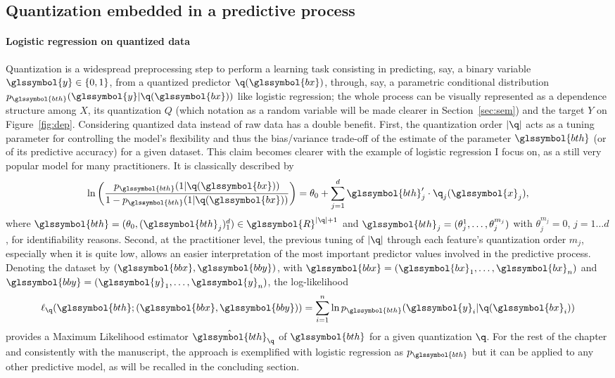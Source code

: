 \subsection{Quantization embedded in a predictive process}

\paragraph{Logistic regression on quantized data}

Quantization is a widespread preprocessing step to perform a learning task consisting in predicting, say, a binary variable $\glssymbol{y}\in\{0,1\}$, from a quantized predictor  $\q(\glssymbol{bx})$, through, say, a parametric conditional distribution $p_{\glssymbol{bth}}(\glssymbol{y}|\q(\glssymbol{bx}))$ like logistic regression; the whole process can be visually represented as a dependence structure among $X$, its quantization $Q$ (which notation as a random variable will be made clearer in Section~\ref{sec:sem}) and the target $Y$ on Figure~\ref{fig:dep}. Considering quantized data instead of raw data has a double benefit. First, the quantization order $|\q|$ acts as a tuning parameter for controlling the model's flexibility and thus the bias/variance trade-off of the estimate of the parameter $\glssymbol{bth}$ (or of its predictive accuracy) for a given dataset. This claim becomes clearer with the example of logistic regression I focus on, as a still very popular model for many practitioners. It is classically described by
\begin{equation}
    \label{eq:reglogq}
\ln \left( \dfrac{p_{\glssymbol{bth}}(1|\q(\glssymbol{bx}))}{1 - p_{\glssymbol{bth}}(1|\q(\glssymbol{bx}))} \right) = \theta_0 + \sum_{j=1}^d \glssymbol{bth}_j' \cdot \q_j(\glssymbol{x}_j),
\end{equation}
where $\glssymbol{bth} = (\theta_{0},(\glssymbol{bth}_j)_1^d) \in \glssymbol{R}^{|\q|+1}$ and $\glssymbol{bth}_j = (\theta_{j}^{1},\dots,\theta_{j}^{m_j})$ with $\theta_{j}^{m_j} = 0$, $j=1 \ldots d$, for identifiability reasons.
Second, at the practitioner level, the previous tuning of $|\q|$ through each feature's quantization order $m_j$, especially when it is quite low, allows an easier interpretation of the most important predictor values involved in the predictive process. Denoting the dataset by $(\glssymbol{bbx},\glssymbol{bby})$, with $\glssymbol{bbx}=(\glssymbol{bx}_1,\ldots,\glssymbol{bx}_n)$ and $\glssymbol{bby}=(\glssymbol{y}_1,\ldots,\glssymbol{y}_n)$, the log-likelihood 
\begin{equation}
\label{eq:lq}
\ell_{\q}(\glssymbol{bth} ; (\glssymbol{bbx},\glssymbol{bby}))=\sum_{i=1}^n \ln p_{\glssymbol{bth}}(\glssymbol{y}_i|\q(\glssymbol{bx}_i))
\end{equation}
provides a Maximum Likelihood estimator $\hat{\glssymbol{bth}}_\q$ of $\glssymbol{bth}$ for a given quantization $\q$. For the rest of the chapter and consistently with the manuscript, the approach is exemplified with logistic regression as $p_{\glssymbol{bth}}$ but it can be applied to any other predictive model, as will be recalled in the concluding section.


